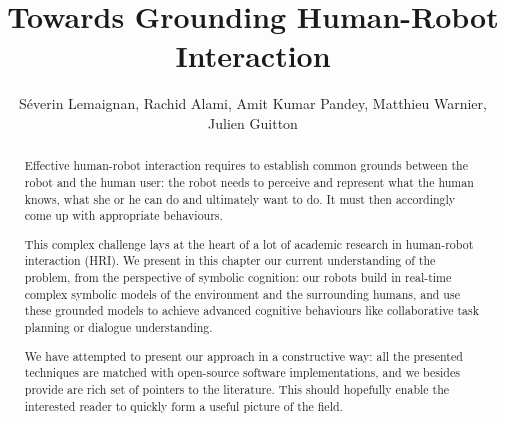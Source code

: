\documentclass{svmult}
\begin{document}


\title*{Towards Grounding Human-Robot Interaction}

\author{
Séverin Lemaignan,
Rachid Alami,
Amit Kumar Pandey,
Matthieu Warnier,
Julien Guitton
}


\maketitle


\begin{abstract}\newline

Effective human-robot interaction requires to establish common grounds between
the robot and the human user: the robot needs to perceive and represent what
the human knows, what she or he can do and ultimately want to do. It must then
accordingly come up with appropriate behaviours.

This complex challenge lays at the heart of a lot of academic research in
human-robot interaction (HRI). We present in this chapter our current
understanding of the problem, from the perspective of symbolic cognition: our
robots build in real-time complex symbolic models of the environment and the
surrounding humans, and use these grounded models to achieve advanced cognitive
behaviours like collaborative task planning or dialogue understanding.

We have attempted to present our approach in a constructive way: all the
presented techniques are matched with open-source software implementations, and
we besides provide are rich set of pointers to the literature. This should
hopefully enable the interested reader to quickly form a useful picture of the
field.

\end{abstract}
\end{document}
